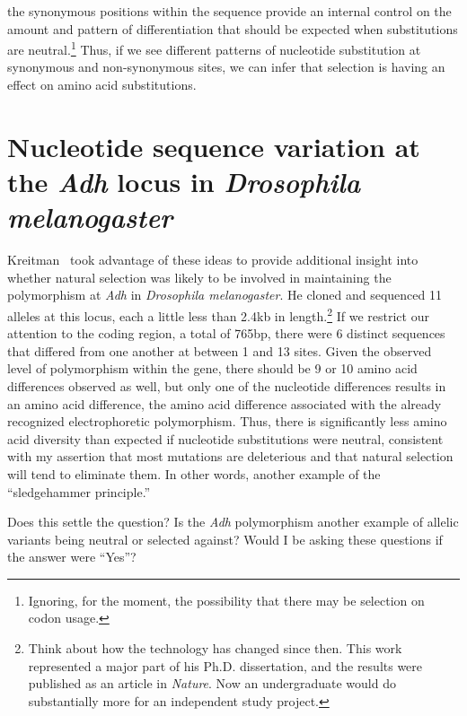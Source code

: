 \documentclass[12pt]{article}
\begin{document}
\noindent the synonymous positions within the sequence provide an
internal control on the amount and pattern of differentiation that
should be expected when substitutions are neutral.\footnote{Ignoring,
  for the moment, the possibility that there may be selection on codon
  usage.}  Thus, if we see different patterns of nucleotide
substitution at synonymous and non-synonymous sites, we can infer that
selection is having an effect on amino acid substitutions.

\section*{Nucleotide sequence variation at the {\it Adh\/} locus in
  {\it Drosophila melanogaster}}

Kreitman~\cite{Kreitman83} took advantage of these ideas to provide
additional insight into whether natural selection was likely to be
involved in maintaining the polymorphism at {\it Adh\/} in {\it
  Drosophila melanogaster}. He cloned and sequenced 11 alleles at this
locus, each a little less than 2.4kb in length.\footnote{Think about
  how the technology has changed since then. This work represented a
  major part of his Ph.D. dissertation, and the results were published
  as an article in {\it Nature}. Now an undergraduate would do
  substantially more for an independent study project.} If we restrict
our attention to the coding region, a total of 765bp, there were 6
distinct sequences that differed from one another at between 1 and 13
sites. Given the observed level of polymorphism within the gene, there
should be 9 or 10 amino acid differences observed as well, but only
one of the nucleotide differences results in an amino acid difference,
the amino acid difference associated with the already recognized
electrophoretic polymorphism. Thus, there is significantly less amino
acid diversity than expected if nucleotide substitutions were neutral,
consistent with my assertion that most mutations are deleterious and
that natural selection will tend to eliminate
them. In other words, another example
of the ``sledgehammer principle.''

Does this settle the question? Is the {\it Adh\/} polymorphism another
example of allelic variants being neutral or selected against? Would I
be asking these questions if the answer were ``Yes''?
\end{document}
